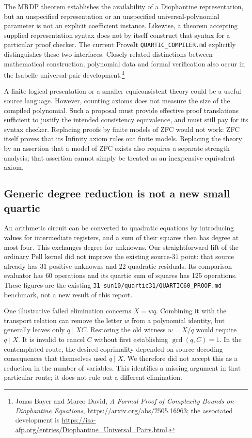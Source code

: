 The MRDP theorem establishes the availability of a Diophantine
representation, but an unspecified representation or an unspecified
universal-polynomial parameter is not an explicit coefficient instance.
Likewise, a theorem accepting supplied representation syntax does not by
itself construct that syntax for a particular proof checker.  The current
ProveIt \texttt{QUARTIC\_COMPILER.md} explicitly distinguishes these two
interfaces.  Closely related distinctions between mathematical
construction, polynomial data and formal verification also occur in the
Isabelle universal-pair development.\footnote{Jonas Bayer and Marco David,
\emph{A Formal Proof of Complexity Bounds on Diophantine Equations},
\url{https://arxiv.org/abs/2505.16963}; the associated development is
\url{https://isa-afp.org/entries/Diophantine_Universal_Pairs.html}.}

A finite logical presentation or a smaller equiconsistent theory could be
a useful source language.  However, counting axioms does not measure the
size of the compiled polynomial.  Such a proposal must provide effective
proof translations sufficient to justify the intended consistency
equivalence, and must still pay for its syntax checker.  Replacing proofs
by finite models of ZFC would not work: ZFC itself proves that its Infinity
axiom rules out finite models.  Replacing the theory by an assertion that
a model of ZFC exists also requires a separate strength analysis; that
assertion cannot simply be treated as an inexpensive equivalent axiom.

\subsection{Generic degree reduction is not a new small quartic}

An arithmetic circuit can be converted to quadratic equations by
introducing values for intermediate registers, and a sum of their squares
then has degree at most four.  This exchanges degree for unknowns.  Our
straightforward lift of the ordinary Pell kernel did not improve the
existing source-31 point: that source already has 31 positive unknowns and
22 quadratic residuals.  Its comparison evaluator has 60 operations and
its quartic sum of squares has 125 operations.  These figures are the
existing \texttt{31-sun10/quartic31/QUARTIC60\_PROOF.md} benchmark, not a
new result of this report.

One illustrative failed elimination concerns \(X=wq\).  Combining it
with the transport relation can remove the letter \(w\) from a polynomial
identity, but generally leaves only \(q\mid XC\).  Restoring the old
witness \(w=X/q\) would require \(q\mid X\).  It is invalid to cancel
\(C\) without first establishing \(\gcd(q,C)=1\).  In the contemplated
route, the desired coprimality depended on source-decoding consequences
that themselves used \(q\mid X\).  We therefore did not accept this as a
reduction in the number of variables.  This identifies a missing argument
in that particular route; it does not rule out a different elimination.

